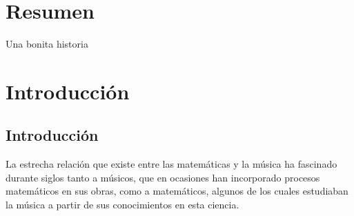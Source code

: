 \documentclass[a4paper, openright, 11pt, titlepage]{report}
\theoremstyle{definition}\newtheorem{defin}[propo]{Definition}
\theoremstyle{definition}\newtheorem{obser}[propo]{Remark}
\theoremstyle{definition}\newtheorem{ejem}[propo]{Ejemplo}
\theoremstyle{definition}\newtheorem{algoritmo}[propo]{Algoritmo}
\begin{document}
\chapter*{Resumen} %

Una bonita historia
\tableofcontents %

\cleardoublepage
{} %
\listoffigures %

\cleardoublepage
{} %
\listoftables %
\newpage
\chapter{Introducción}
\section{Introducción}
\pagestyle{fancy}
\fancyhf{}
\rhead[\textit{\rightmark}]{\textit{\rightmark}}

La estrecha relación que existe entre las matemáticas y la música ha fascinado durante siglos tanto a músicos, que en ocasiones han incorporado procesos matemáticos en sus obras, como a matemáticos, algunos de los cuales estudiaban la música a partir de sus conocimientos en esta ciencia.\\
\end{document}
